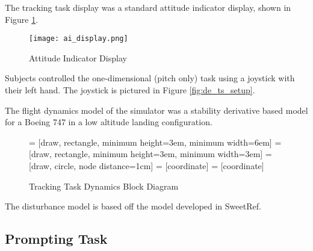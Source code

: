 The tracking task display was a standard attitude indicator display, shown in Figure \ref{fig:de_ai_display}.

\begin{figure}
    \texttt{[image: ai\_display.png]}
    \caption{Attitude Indicator Display}
    \label{fig:de_ai_display}
\end{figure}

Subjects controlled the one-dimensional (pitch only) task using a joystick with their left hand.
The joystick is pictured in Figure \ref{fig:de_ts_setup}.

The flight dynamics model of the simulator was a stability derivative based model for a Boeing 747 in a low altitude landing configuration.

\begin{figure}
     = [draw, rectangle, minimum height=3em, minimum width=6em]
     = [draw, rectangle, minimum height=3em, minimum width=3em]
     = [draw, circle, node distance=1cm]
     = [coordinate]
     = [coordinate]
    \caption{Tracking Task Dynamics Block Diagram}
    \label{fig:de_block_diagram}
\end{figure}


The disturbance model is based off the model developed in SweetRef.


\subsection{Prompting Task}

